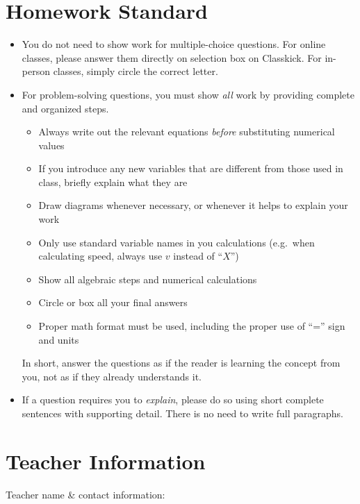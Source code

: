 \documentclass{../oss-handout}
\begin{document}
\section*{Homework Standard}
\begin{itemize}
\item You do not need to show work for multiple-choice questions. For online
  classes, please answer them directly on selection box on Classkick. For
  in-person classes, simply circle the correct letter.
\item For problem-solving questions, you must show \emph{all} work by providing
  complete and organized steps.
  \begin{itemize}[nosep]
  \item Always write out the relevant equations \emph{before} substituting
    numerical values
  \item If you introduce any new variables that are different from those used
    in class, briefly explain what they are
  \item Draw diagrams whenever necessary, or whenever it helps to explain your
    work
  \item Only use standard variable names in you calculations (e.g.\ when
    calculating speed, always use $v$ instead of ``$X$'')
  \item Show all algebraic steps and numerical calculations
  \item Circle or box all your final answers
  \item Proper math format must be used, including the proper use of ``='' sign
    and units
  \end{itemize}
  In short, answer the questions as if the reader is learning the concept from
  you, not as if they already understands it.
\item If a question requires you to \emph{explain}, please do so using short
  complete sentences with supporting detail. There is no need to write full
  paragraphs.
\end{itemize}

\vspace{\stretch1}
\section*{Teacher Information}
Teacher name \& contact information: \underline{\hspace{4.5in}}
\end{document}
